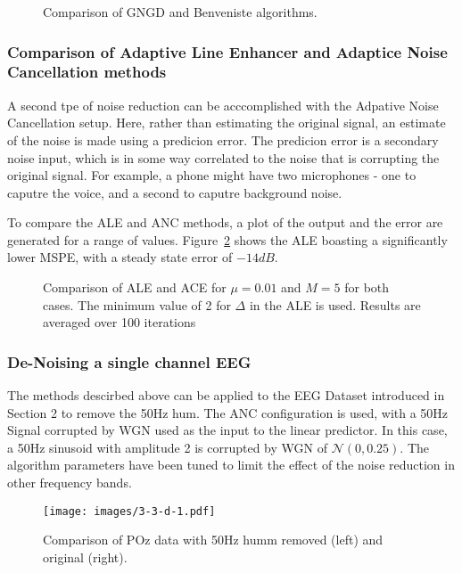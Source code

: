 \documentclass[main.tex]{subfiles}
\begin{document}
\begin{figure}[H]
	\centering 
	\resizebox{0.7\textwidth}{!}{}
	\caption{Comparison of GNGD and Benveniste algorithms.}
	\label{fig:q3_3_b}
\end{figure}


\subsubsection{Comparison of Adaptive Line Enhancer and Adaptice Noise Cancellation methods}

A second tpe of noise reduction can be acccomplished with the Adpative Noise Cancellation setup. Here, rather than estimating the original signal, an estimate of the noise is made using a predicion error. The predicion error is a secondary noise input, which is in some way correlated to the noise that is corrupting the original signal. For example, a phone might have two microphones - one to caputre the voice, and a second to caputre background noise.

To compare the ALE and ANC methods, a plot of the output and the error are generated for a range of values. Figure~\ref{fig:q3_3_c} shows the ALE boasting a significantly lower MSPE, with a steady state error of $-14dB$.

\begin{figure}[H]
	\centering 
	\resizebox{0.7\textwidth}{!}{}
	\caption{Comparison of ALE and ACE for $\mu = 0.01$ and $M = 5$ for both cases. The minimum value of 2 for $\Delta$ in the ALE is used. Results are averaged over 100 iterations}
	\label{fig:q3_3_c}
\end{figure}


\subsubsection{De-Noising a single channel EEG}

The methods descirbed above can be applied to the EEG Dataset introduced in Section 2 to remove the 50Hz hum. The ANC configuration is used, with a 50Hz Signal corrupted by WGN used as the input to the linear predictor. In this case, a 50Hz sinusoid with amplitude 2 is corrupted by WGN of $\mathcal{N}(0,0.25)$. The algorithm parameters have been tuned to limit the effect of the noise reduction in other frequency bands.

\begin{figure}[H]
	\centering
	\texttt{[image: images/3-3-d-1.pdf]}
	\caption{Comparison of POz data with 50Hz humm removed (left) and original (right).}
	\label{fig:3-3-d-1}
\end{figure}
\end{document}
